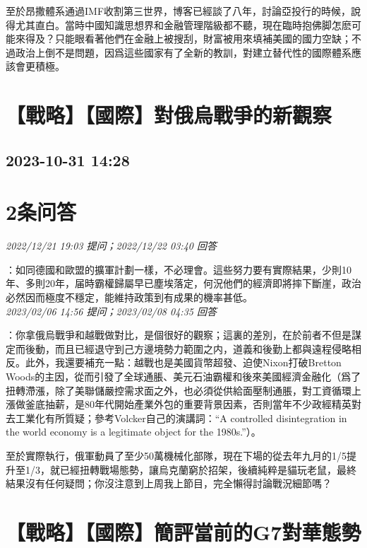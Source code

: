 \documentclass[twocolumn]{ctexart}
\begin{document}
至於昂撒體系通過IMF收割第三世界，博客已經談了八年，討論亞投行的時候，說得尤其直白。當時中國知識思想界和金融管理階級都不聽，現在臨時抱佛脚怎麽可能來得及？只能眼看著他們在金融上被搜刮，財富被用來填補美國的國力空缺；不過政治上倒不是問題，因爲這些國家有了全新的教訓，對建立替代性的國際體系應該會更積極。
\\


\section{【戰略】【國際】對俄烏戰爭的新觀察}
\subsection{2023-10-31 14:28}


\section{2条问答}

\textit{\hfill\noindent\small 2022/12/21 19:03 提问；2022/12/22 03:40 回答}

：如同德國和歐盟的擴軍計劃一樣，不必理會。這些努力要有實際結果，少則10年、多則20年，届時霸權歸屬早已塵埃落定，何況他們的經濟即將摔下斷崖，政治必然因而極度不穩定，能維持政策到有成果的機率甚低。
\\

\textit{\hfill\noindent\small 2023/02/06 14:56 提问；2023/02/08 04:35 回答}

：你拿俄烏戰爭和越戰做對比，是個很好的觀察；這裏的差別，在於前者不但是謀定而後動，而且已經退守到己方邊境勢力範圍之内，道義和後勤上都與遠程侵略相反。此外，我還要補充一點：越戰也是美國貨幣超發、迫使Nixon打破Bretton Woods的主因，從而引發了全球通脹、美元石油霸權和後來美國經濟金融化（爲了扭轉滯漲，除了美聯儲嚴控需求面之外，也必須從供給面壓制通脹，對工資循環上漲做釜底抽薪，是80年代開始產業外包的重要背景因素，否則當年不少政經精英對去工業化有所質疑；參考Volcker自己的演講詞：“A controlled disintegration in the world economy is a legitimate object for the 1980s.”）。

至於實際執行，俄軍動員了至少50萬機械化部隊，現在下場的從去年九月的1/5提升至1/3，就已經扭轉戰場態勢，讓烏克蘭窮於招架，後續純粹是貓玩老鼠，最終結果沒有任何疑問；你沒注意到上周我上節目，完全懶得討論戰況細節嗎？
\\


\section{【戰略】【國際】簡評當前的G7對華態勢}
\end{document}
